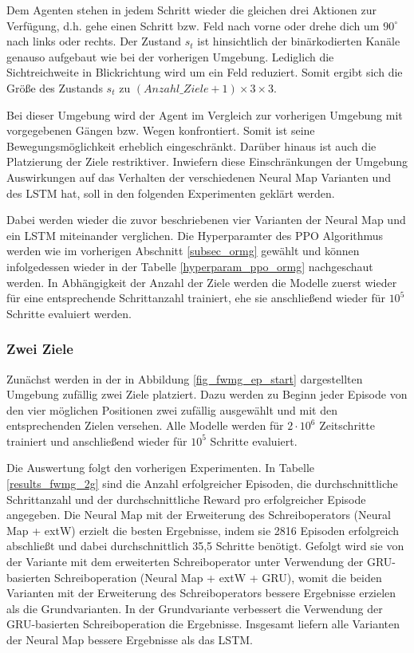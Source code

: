 Dem Agenten stehen in jedem Schritt wieder die gleichen drei Aktionen zur Verfügung, d.h. gehe einen Schritt bzw. Feld nach vorne oder drehe dich um $90^\circ$ nach links oder rechts. Der Zustand $s_t$ ist hinsichtlich der binärkodierten Kanäle genauso aufgebaut wie bei der vorherigen Umgebung. Lediglich die Sichtreichweite in Blickrichtung wird um ein Feld reduziert. Somit ergibt sich die Größe des Zustands $s_t$ zu $(Anzahl\_Ziele + 1) \times 3 \times 3$.

Bei dieser Umgebung wird der Agent im Vergleich zur vorherigen Umgebung mit vorgegebenen Gängen bzw. Wegen konfrontiert. Somit ist seine Bewegungsmöglichkeit erheblich eingeschränkt. Darüber hinaus ist auch die Platzierung der Ziele restriktiver. Inwiefern diese Einschränkungen der Umgebung Auswirkungen auf das Verhalten der verschiedenen Neural Map Varianten und des LSTM hat, soll in den folgenden Experimenten geklärt werden.

Dabei werden wieder die zuvor beschriebenen vier Varianten der Neural Map und ein LSTM miteinander verglichen. Die Hyperparamter des PPO Algorithmus werden wie im vorherigen Abschnitt \ref{subsec_ormg} gewählt und können infolgedessen wieder in der Tabelle \ref{hyperparam_ppo_ormg} nachgeschaut werden. In Abhängigkeit der Anzahl der Ziele werden die Modelle zuerst wieder für eine entsprechende Schrittanzahl trainiert, ehe sie anschließend wieder für $10^5$ Schritte evaluiert werden.

\subsubsection{Zwei Ziele}

Zunächst werden in der in Abbildung \ref{fig_fwmg_ep_start} dargestellten Umgebung zufällig zwei Ziele platziert. Dazu werden zu Beginn jeder Episode von den vier möglichen Positionen zwei zufällig ausgewählt und mit den entsprechenden Zielen versehen. Alle Modelle werden für $2\cdot10^6$ Zeitschritte trainiert und anschließend wieder für $10^5$ Schritte evaluiert.

Die Auswertung folgt den vorherigen Experimenten. In Tabelle \ref{results_fwmg_2g} sind die Anzahl erfolgreicher Episoden, die durchschnittliche Schrittanzahl und der durchschnittliche Reward pro erfolgreicher Episode angegeben. Die Neural Map mit der Erweiterung des Schreiboperators (Neural Map + extW) erzielt die besten Ergebnisse, indem sie 2816 Episoden erfolgreich abschließt und dabei durchschnittlich 35,5 Schritte benötigt. Gefolgt wird sie von der Variante mit dem erweiterten Schreiboperator unter Verwendung der GRU-basierten Schreiboperation (Neural Map + extW + GRU), womit die beiden Varianten mit der Erweiterung des Schreiboperators bessere Ergebnisse erzielen als die Grundvarianten. In der Grundvariante verbessert die Verwendung der GRU-basierten Schreiboperation die Ergebnisse. Insgesamt liefern alle Varianten der Neural Map bessere Ergebnisse als das LSTM.

